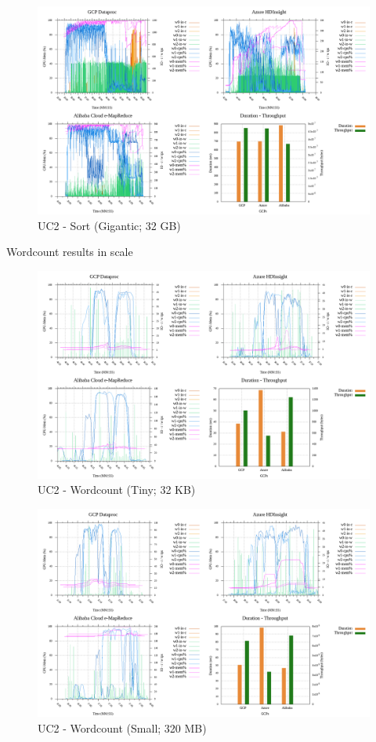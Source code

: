\documentclass[review]{elsarticle}
\begin{document}
\begin{figure}[p]
	\includegraphics[width=\textwidth]{uc2-srt-g-cmidt}
	\caption{UC2 - Sort (Gigantic; 32 GB)}
	\label{fig:uc2-srt-g-cmidt}
	\centering
\end{figure}

Wordcount results in scale

\begin{figure}[p]
	\includegraphics[width=\textwidth]{uc2-wrdcnt-t-cmidt}
	\caption{UC2 - Wordcount (Tiny; 32 KB)}
	\label{fig:uc2-wrdcnt-t-cmidt}
	\centering
\end{figure}

\begin{figure}[p]
	\includegraphics[width=\textwidth]{uc2-wrdcnt-s-cmidt}
	\caption{UC2 - Wordcount (Small; 320 MB)}
	\label{fig:uc2-wrdcnt-s-cmidt}
	\centering
\end{figure}
\end{document}
